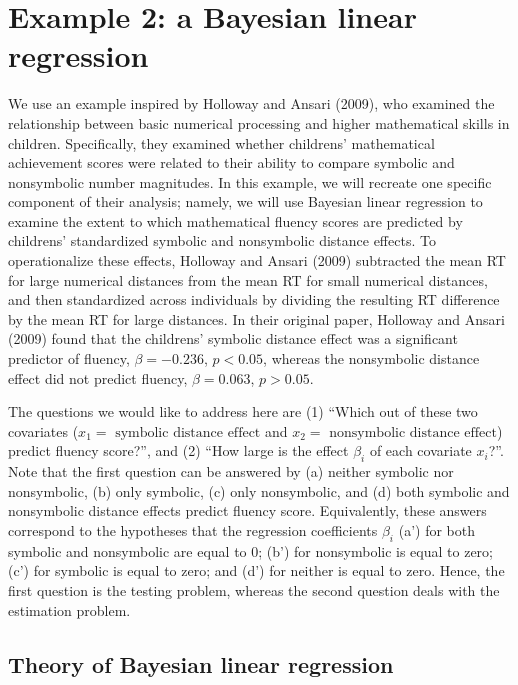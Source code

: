 \documentclass[english,,doc,floatsintext]{apa6}
\begin{document}
\hypertarget{example-2-a-bayesian-linear-regression}{%
\section{Example 2: a Bayesian linear regression}\label{example-2-a-bayesian-linear-regression}}

We use an example inspired by Holloway and Ansari (2009), who examined the relationship between basic numerical processing and higher mathematical skills in children. Specifically, they examined whether childrens' mathematical achievement scores were related to their ability to compare symbolic and nonsymbolic number magnitudes. In this example, we will recreate one specific component of their analysis; namely, we will use Bayesian linear regression to examine the extent to which mathematical fluency scores are predicted by childrens' standardized symbolic and nonsymbolic distance effects. To operationalize these effects, Holloway and Ansari (2009) subtracted the mean RT for large numerical distances from the mean RT for small numerical distances, and then standardized across individuals by dividing the resulting RT difference by the mean RT for large distances.
In their original paper, Holloway and Ansari (2009) found that the childrens' symbolic distance effect was a significant predictor of fluency, \(\beta = -0.236\), \(p<0.05\), whereas the nonsymbolic distance effect did not predict fluency, \(\beta=0.063\), \(p>0.05\).

The questions we would like to address here are (1) ``Which out of these two covariates (\(x_{1}=\text{ symbolic distance effect}\) and \(x_{2}=\text{ nonsymbolic distance effect}\)) predict fluency score?'', and (2) ``How large is the effect \(\beta_i\) of each covariate \(x_{i}\)?''. Note that the first question can be answered by (a) neither symbolic nor nonsymbolic, (b) only symbolic, (c) only nonsymbolic, and (d) both symbolic and nonsymbolic distance effects predict fluency score. Equivalently, these answers correspond to the hypotheses that the regression coefficients \(\beta_{i}\) (a') for both symbolic and nonsymbolic are equal to 0; (b') for nonsymbolic is equal to zero; (c') for symbolic is equal to zero; and (d') for neither is equal to zero. Hence, the first question is the testing problem, whereas the second question deals with the estimation problem.

\hypertarget{theory-of-bayesian-linear-regression}{%
\subsection{Theory of Bayesian linear regression}\label{theory-of-bayesian-linear-regression}}
\end{document}
